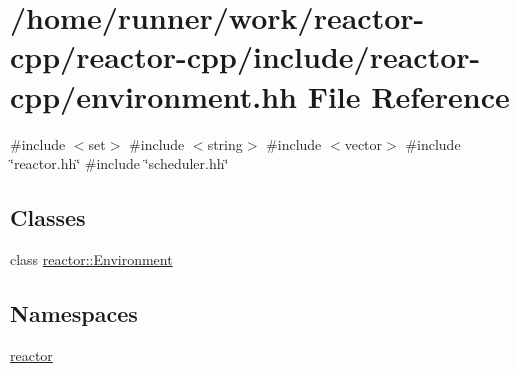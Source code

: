 \hypertarget{environment_8hh}{}\section{/home/runner/work/reactor-\/cpp/reactor-\/cpp/include/reactor-\/cpp/environment.hh File Reference}
\label{environment_8hh}
{\ttfamily \#include $<$set$>$}\newline
{\ttfamily \#include $<$string$>$}\newline
{\ttfamily \#include $<$vector$>$}\newline
{\ttfamily \#include \char`\"{}reactor.\+hh\char`\"{}}\newline
{\ttfamily \#include \char`\"{}scheduler.\+hh\char`\"{}}\newline
\subsection*{Classes}
\begin{DoxyCompactItemize}
\item 
class \hyperlink{classreactor_1_1Environment}{reactor\+::\+Environment}
\end{DoxyCompactItemize}
\subsection*{Namespaces}
\begin{DoxyCompactItemize}
\item 
 \hyperlink{namespacereactor}{reactor}
\end{DoxyCompactItemize}
